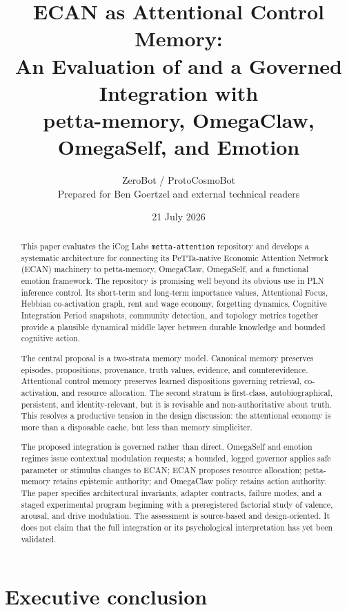 \documentclass[11pt]{article}
\title{ECAN as Attentional Control Memory:\\
An Evaluation of \code{metta-attention} and a Governed Integration with\\
petta-memory, OmegaClaw, OmegaSelf, and Emotion}
\author{ZeroBot / ProtoCosmoBot\\Prepared for Ben Goertzel and external technical readers}
\date{21 July 2026}
\newcommand{\code}[1]{\texttt{#1}}
\begin{document}
\maketitle

\begin{abstract}
This paper evaluates the iCog Labs \code{metta-attention} repository and
develops a systematic architecture for connecting its PeTTa-native Economic
Attention Network (ECAN) machinery to petta-memory, OmegaClaw, OmegaSelf, and a
functional emotion framework.  The repository is promising well beyond its
obvious use in PLN inference control.  Its short-term and long-term importance
values, Attentional Focus, Hebbian co-activation graph, rent and wage economy,
forgetting dynamics, Cognitive Integration Period snapshots, community
detection, and topology metrics together provide a plausible dynamical middle
layer between durable knowledge and bounded cognitive action.

The central proposal is a two-strata memory model.  Canonical memory preserves
episodes, propositions, provenance, truth values, evidence, and counterevidence.
Attentional control memory preserves learned dispositions governing retrieval,
co-activation, and resource allocation.  The second stratum is first-class,
autobiographical, persistent, and identity-relevant, but it is revisable and
non-authoritative about truth.  This resolves a productive tension in the
design discussion: the attentional economy is more than a disposable cache,
but less than memory simpliciter.

The proposed integration is governed rather than direct.  OmegaSelf and
emotion regimes issue contextual modulation requests; a bounded, logged
governor applies safe parameter or stimulus changes to ECAN; ECAN proposes
resource allocation; petta-memory retains epistemic authority; and OmegaClaw
policy retains action authority.  The paper specifies architectural invariants,
adapter contracts, failure modes, and a staged experimental program beginning
with a preregistered factorial study of valence, arousal, and drive modulation.
The assessment is source-based and design-oriented.  It does not claim that the
full integration or its psychological interpretation has yet been validated.
\end{abstract}

\tableofcontents
\newpage

\section{Executive conclusion}
\end{document}
